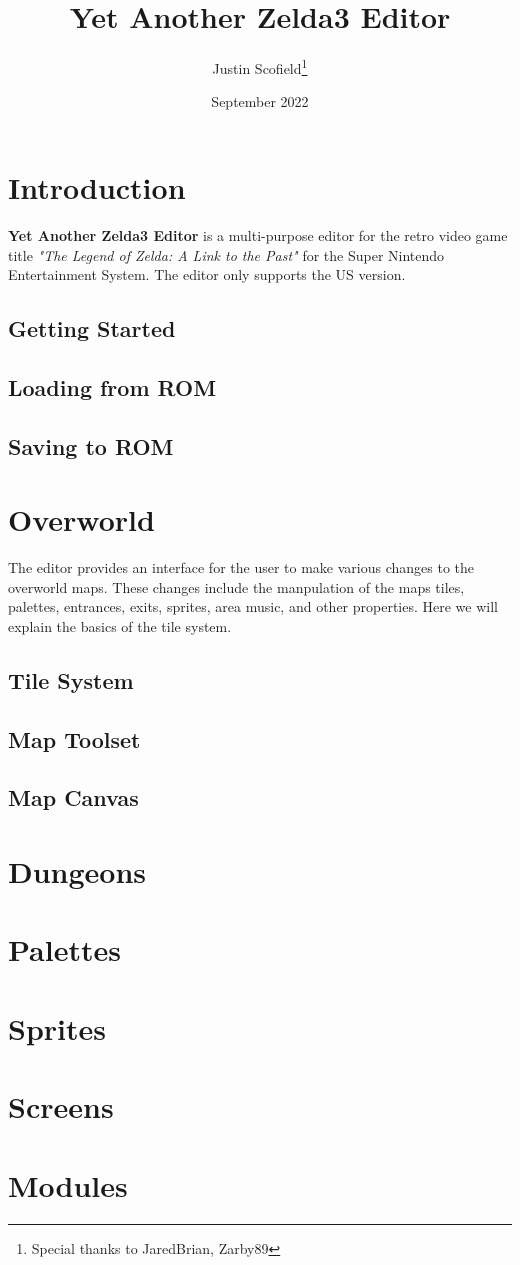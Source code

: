 \documentclass[12pt, oneside]{report}
\title{Yet Another Zelda3 Editor}
\author{Justin Scofield\thanks{Special thanks to JaredBrian, Zarby89}}
\date{September 2022}
\begin{document}
\maketitle

\tableofcontents

\chapter{Introduction}

{\bf Yet Another Zelda3 Editor} is a multi-purpose editor for the retro video game title {\it {"The Legend of Zelda: A Link to the Past"}} for the Super Nintendo Entertainment System. The editor only supports the US version.

\section{Getting Started}
\section{Loading from ROM}
\section{Saving to ROM}

\chapter{Overworld}

The editor provides an interface for the user to make various changes to the overworld maps. These changes include the manpulation of the maps tiles, palettes, entrances, exits, sprites, area music, and other properties. Here we will explain the basics of the tile system.

\section{Tile System}
\section{Map Toolset}
\section{Map Canvas}

\chapter{Dungeons}
\chapter{Palettes}
\chapter{Sprites}
\chapter{Screens}
\chapter{Modules}
\end{document}
